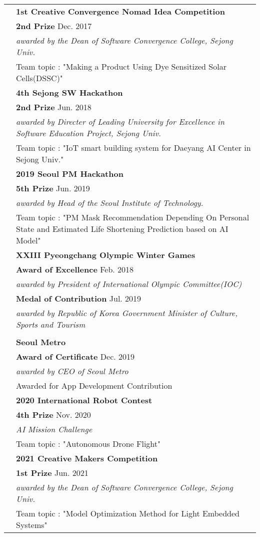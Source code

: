 \documentclass[letterpaper, 11pt]{article}
\begin{document}
\begin{longtable}{p{1.3in}p{4.8in}}
{\color{Violet}{Awards}} 
& {\textbf{1st Creative Convergence Nomad Idea Competition}} \\
& {\textbf{2nd Prize}} \hfill Dec. 2017 \\
& {\it awarded by the Dean of Software Convergence College, Sejong Univ.}  \\
& Team topic : "Making a Product Using Dye Sensitized Solar Cells(DSSC)"
& \\
& {\textbf{4th Sejong SW Hackathon}} \\
& {\textbf{2nd Prize}} \hfill Jun. 2018 \\
& {\it awarded by Directer of Leading University for Excellence in Software Education Project, Sejong Univ.}  \\
& Team topic : "IoT smart building system for Daeyang AI Center in Sejong Univ."
& \\
& {\textbf{2019 Seoul PM Hackathon}} \\
& {\textbf{5th Prize}} \hfill Jun. 2019 \\
& {\it awarded by Head of the Seoul Institute of Technology.}  \\
& Team topic : "PM Mask Recommendation Depending On Personal State and Estimated Life Shortening Prediction based on AI Model"
& \\
& {\textbf{XXIII Pyeongchang Olympic Winter Games}} \\
& {\textbf{Award of Excellence}} \hfill Feb. 2018 \\
& {\it awarded by President of International Olympic Committee(IOC)}  \\
& {\textbf{Medal of Contribution}} \hfill Jul. 2019 \\
& {\it awarded by Republic of Korea Government Minister of Culture, Sports and Tourism}  \\
& \\
& {\textbf{Seoul Metro}} \\
& {\textbf{Award of Certificate}} \hfill Dec. 2019 \\
& {\it awarded by CEO of Seoul Metro}  \\
& Awarded for App Development Contribution
& \\
& {\textbf{2020 International Robot Contest}} \\
& {\textbf{4th Prize}} \hfill Nov. 2020 \\
& {\it AI Mission Challenge}  \\
& Team topic : "Autonomous Drone Flight"
& \\
& {\textbf{2021 Creative Makers Competition}} \\
& {\textbf{1st Prize}} \hfill Jun. 2021 \\
& {\it awarded by the Dean of Software Convergence College, Sejong Univ.}  \\
& Team topic : "Model Optimization Method for Light Embedded Systems"
&\\


\end{longtable}
\end{document}
